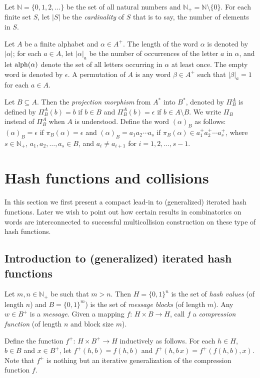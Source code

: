 \documentclass[submission,copyright,creativecommons]{eptcs}
\newcommand{\N}{\mathbb N}
\newcommand{\alp}{{\rm alph}}
\begin{document}
Let $\N=\{0, 1, 2, \ldots\}$ be the set of all natural numbers and $\N_+=\N\setminus
\{0\}$. For each finite set $S$, let $|S|$ be the \textit{cardinality} of $S$ that is to say, the number of elements in $S$.

Let $A$ be a finite alphabet and $\alpha\in A^+$. The length of the word $\alpha$ is denoted
by $|\alpha|$; for each $a\in A$, let $|\alpha|_a$ be the number of occurrences of the letter
$a$ in $\alpha$, and let $\alp(\alpha)$ denote the set of all letters occurring in $\alpha$ at
least once. The empty word is denoted by $\epsilon$. A permutation of $A$ is any word $\beta\in A^+$ such that $|\beta|_a=1$ for each $a\in A$.

Let $B\subseteq A$. Then the \textit{projection morphism} from $A^\ast$ into $B^\ast$, denoted by  $\Pi^A_B$ is defined by $\Pi^A_B(b)=b$ if $b\in B$ and $\Pi^A_B(b)=\epsilon$ if $b\in A\setminus B$. We write $\Pi_B$ instead of $\Pi^A_B$ when $A$ is understood. Define the word $(\alpha)_B$ as follows: $(\alpha)_B=\epsilon$ if $\pi_B(\alpha)=\epsilon$ and $(\alpha)_B=a_1a_2\cdots a_s$ if $\pi_B(\alpha)\in a_1^+a_2^+\cdots
a_s^+$, where $s\in\N_+$, $a_1,a_2,\ldots,a_s\in B$, and $a_i\neq
a_{i+1}$ for $i=1,2,\ldots,s-1$.

\section{Hash functions and collisions}

In this section we first present a  compact lead-in  to (generalized) iterated hash functions. Later we wish to point out how certain results in  combinatorics on words are interconnected to successful multicollision construction on these type of hash functions. 

\subsection{Introduction to (generalized) iterated hash functions}\label{bc2}

Let $m,n\in\N_+$ be such that $m>n$. Then $H=\{0,1\}^n$ is the set of \textit{hash values} (of length $n$) and $B=\{0,1\}^m$) is the set of \textit{message blocks} (of length $m$). Any $w\in B^+$ is a \textit{message}. Given a mapping  $f:\,H\times B\rightarrow H$, call $f$ a \textit{compression function} (of length $n$ and block size $m$).  

Define the function   $f^+:\,H\times B^+\rightarrow H$ inductively as follows. For each $h\in H$, $b\in B$ and $x\in B^+$, let $f^+(h,b)=f(h,b)$ and
$f^+(h,b\,x)=f^+(f(h,b),x)$. Note that $f^+$ is nothing but an iterative generalization of the compression function $f$.
\end{document}
